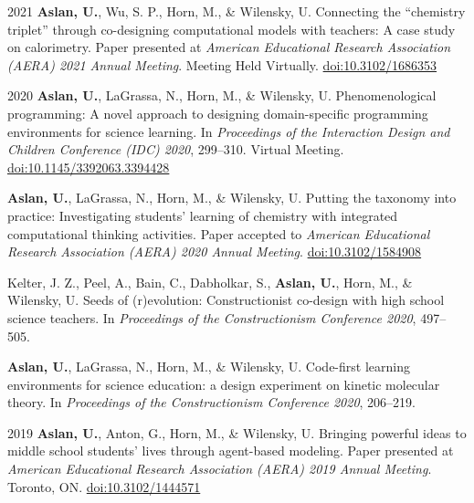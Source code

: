 \documentclass[11pt,letterpaper]{report} %
\begin{document}
    \begin{tablist}

        \item[2021] \tab{}\textbf{Aslan, U.}, Wu, S. P., Horn, M., \& Wilensky, U. Connecting the \enquote{chemistry triplet} through co-designing computational models with teachers: A case study on calorimetry. Paper presented at \textit{American Educational Research Association (AERA) 2021 Annual Meeting}. Meeting Held Virtually. \href{https://doi.org/10.3102/1686353}{doi:10.3102/1686353}

        \item[2020] \tab{}\textbf{Aslan, U.}, LaGrassa, N., Horn, M., \& Wilensky, U. Phenomenological programming: A novel approach to designing domain-specific programming environments for science learning. In \textit{Proceedings of the Interaction Design and Children Conference (IDC) 2020}, 299--310. Virtual Meeting. \href{https://doi.org/10.1145/3392063.3394428}{doi:10.1145/3392063.3394428}

        \item[] \tab{}\textbf{Aslan, U.}, LaGrassa, N., Horn, M., \& Wilensky, U. Putting the taxonomy into practice: Investigating students’ learning of chemistry with integrated computational thinking activities. Paper accepted to \textit{American Educational Research Association (AERA) 2020 Annual Meeting}. \href{https://doi.org/10.3102/1584908}{doi:10.3102/1584908}

        \item[] \tab{}Kelter, J. Z., Peel, A., Bain, C., Dabholkar, S., \textbf{Aslan, U.}, Horn, M., \& Wilensky, U. Seeds of (r)evolution: Constructionist co-design with high school science teachers. In \textit{Proceedings of the Constructionism Conference 2020}, 497--505.

        \item[] \tab{}\textbf{Aslan, U.}, LaGrassa, N., Horn, M., \& Wilensky, U. Code-first learning environments for science education: a design experiment on kinetic molecular theory. In \textit{Proceedings of the Constructionism Conference 2020}, 206--219.

        \item[2019] \tab{}\textbf{Aslan, U.}, Anton, G., Horn, M., \& Wilensky, U. Bringing powerful ideas to middle school students' lives through agent-based modeling. Paper presented at \textit{American Educational Research Association (AERA) 2019 Annual Meeting}. Toronto, ON. \href{https://doi.org/10.3102/1444571}{doi:10.3102/1444571}


\end{tablist}
\end{document}

